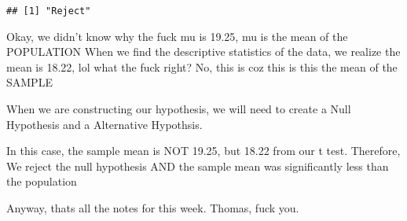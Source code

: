 \documentclass[
]{article}
\newenvironment{Shaded}{\begin{snugshade}}{\end{snugshade}}
\newcommand{\CommentTok}[1]{\textcolor[rgb]{0.56,0.35,0.01}{\textit{#1}}}
\begin{document}
\begin{verbatim}
## [1] "Reject"
\end{verbatim}

\begin{Shaded}
\end{Shaded}

Okay, we didn't know why the fuck mu is 19.25, mu is the mean of the
POPULATION When we find the descriptive statistics of the data, we
realize the mean is 18.22, lol what the fuck right? No, this is coz this
is this the mean of the SAMPLE

When we are constructing our hypothesis, we will need to create a Null
Hypothesis and a Alternative Hypothsis.

In this case, the sample mean is NOT 19.25, but 18.22 from our t test.
Therefore, We reject the null hypothesis AND the sample mean was
significantly less than the population

Anyway, thats all the notes for this week. Thomas, fuck you.
\end{document}
